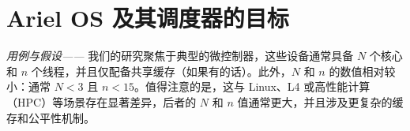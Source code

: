 \section{Ariel OS 及其调度器的目标}
\label{sec:goals}

\textit{用例与假设——} 我们的研究聚焦于典型的微控制器，这些设备通常具备 $N$ 个核心和 $n$ 个线程，并且仅配备共享缓存（如果有的话）。此外，$N$ 和 $n$ 的数值相对较小：通常 $N < 3$ 且 $n < 15$。值得注意的是，这与 Linux、L4 或高性能计算（HPC）等场景存在显著差异，后者的 $N$ 和 $n$ 值通常更大，并且涉及更复杂的缓存和公平性机制。


